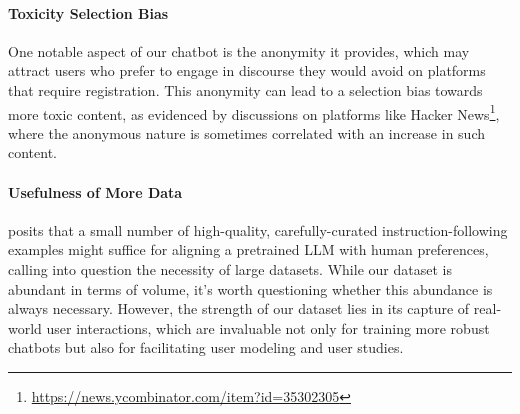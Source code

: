 \documentclass{article} %
\begin{document}

\paragraph{Toxicity Selection Bias} One notable aspect of our chatbot is the anonymity it provides, which may attract users who prefer to engage in discourse they would avoid on platforms that require registration. This anonymity can lead to a selection bias towards more toxic content, as evidenced by discussions on platforms like Hacker News\footnote{\url{https://news.ycombinator.com/item?id=35302305}}, where the anonymous nature is sometimes correlated with an increase in such content.


\paragraph{Usefulness of More Data} \citet{zhou2023lima} posits that a small number of high-quality, carefully-curated instruction-following examples might suffice for aligning a pretrained LLM with human preferences, calling into question the necessity of large datasets. 
While our dataset is abundant in terms of volume, it's worth questioning whether this abundance is always necessary. However, the strength of our dataset lies in its capture of real-world user interactions, which are invaluable not only for training more robust chatbots but also for facilitating user modeling and user studies.
\end{document}
